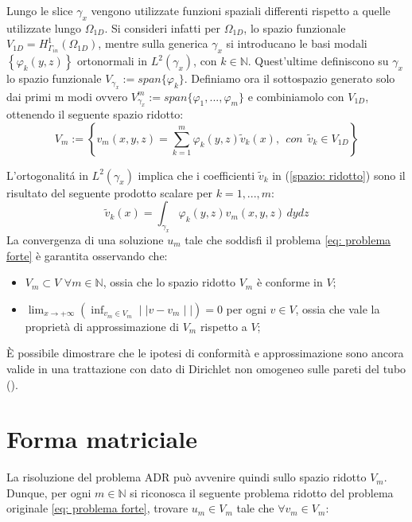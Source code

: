 Lungo le slice $\gamma_x$ vengono utilizzate funzioni spaziali differenti rispetto a quelle utilizzate lungo $\Omega_{1D}$. Si consideri infatti per $\Omega_{1D}$, lo spazio funzionale $V_{1D}=H^1_{\Gamma_{in}}(\Omega_{1D})$, mentre sulla generica $\gamma_x$ si introducano le basi modali $\left\{ \varphi_k(y,z) \right\}$ ortonormali in $L^2(\gamma_x)$, con $k \in \mathbb{N}$.
Quest'ultime definiscono su $\gamma_x$ lo spazio funzionale $V_{\gamma_x}:=span\{\varphi_k\}$.
Definiamo ora il sottospazio generato solo dai primi m modi ovvero  $V^m_{\gamma_x}:=span\{\varphi_1,...,\varphi_m\}$ e combiniamolo con $V_{1D}$, ottenendo il seguente spazio ridotto:
\begin{equation}
\label{spazio: ridotto}
V_m:=\left\{v_m(x,y,z)=\sum^m_{k=1}\varphi_k(y,z)\tilde{v}_k(x) ,\:\:con\:\:\tilde{v}_k\in V_{1D}\right\}
\end{equation}

L'ortogonalit\'a in $L^2(\gamma_x)$ implica che i coefficienti  $\tilde{v}_k$ in (\ref{spazio: ridotto}) sono il risultato del seguente prodotto scalare per $k=1,...,m$:
\begin{displaymath}
\tilde{v}_k(x)=\int_{\gamma_x}\varphi_k(y,z)v_m(x,y,z)\,dydz
\end{displaymath}
La convergenza di una soluzione $u_m$ tale che soddisfi il problema \eqref{eq: problema forte} \`e garantita osservando che:
\begin{itemize}
\item $V_m \subset V$ $\forall m\in \mathbb{N}$, ossia che lo spazio ridotto $V_m$ \`e conforme in $V$;
\item $\displaystyle \lim_{x\to +\infty} \left(\inf_{v_m\in V_m}\mid\mid v-v_m\mid\mid\right)=0$ 
per ogni $v \in V$, ossia che vale la propriet\`a di approssimazione di $V_m$ rispetto a $V$;
\end{itemize}
\`E possibile dimostrare che le ipotesi di conformit\`a e approssimazione sono ancora valide in una trattazione con dato di Dirichlet non omogeneo sulle pareti del tubo
(\cite{perotto:2009}).
\clearpage
\section{Forma matriciale}

La risoluzione del problema ADR pu\`o avvenire quindi sullo spazio ridotto $V_m$.
Dunque, per ogni $m\in\mathbb{N}$ si riconosca il seguente problema ridotto del problema originale \eqref{eq: problema forte}, 
trovare $u_m\in V_m$ tale che $\forall v_m\in V_m$:

